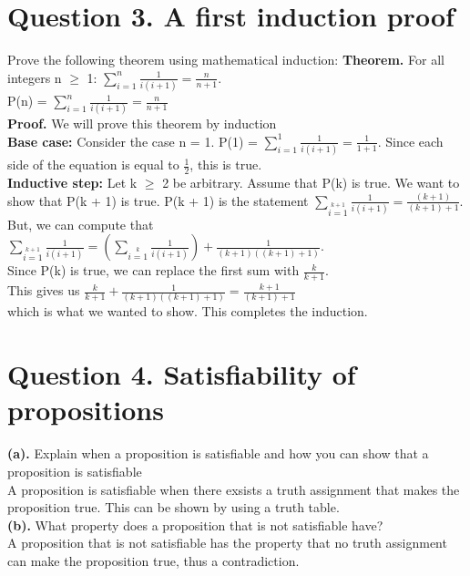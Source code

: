 \documentclass[a4paper]{article}
\begin{document}
\newpage

\section{Question 3. A first induction proof}
Prove the following theorem using mathematical induction:
\textbf{Theorem.} For all integers n $\geq $ 1: $\sum^n_{i=1}{\frac{1}{i(i + 1)} = \frac{n}{n + 1}}$.\\
P(n) = $\sum^n_{i=1}{\frac{1}{i(i + 1)} = \frac{n}{n + 1}}$\\
\textbf{Proof.} We will prove this theorem by induction\\
\textbf{Base case:} Consider the case n = 1. P(1) = $\sum^1_{i=1}{\frac{1}{i(i + 1)} = \frac{1}{1 + 1}}$. Since each side of the equation is equal to $\frac{1}{2}$, this is true.\\
\textbf{Inductive step:} Let k $\geq$ 2 be arbitrary. Assume that P(k) is true. We want to show that P(k + 1) is true. P(k + 1) is the statement $\sum_{i=1}\limits^{k+1}{\frac{1}{i(i + 1)} = \frac{(k+1)}{(k+1) + 1}}$. But, we can compute that\\
$\sum_{i=1}\limits^{k+1}{\frac{1}{i(i + 1)} = (\sum_{i=1}\limits^{k}{\frac{1}{i(i + 1)}}) + \frac{1}{(k+1)((k+1) + 1)}}$.\\
Since P(k) is true, we can replace the first sum with $\frac{k}{k + 1}$.\\
This gives us $\frac{k}{k + 1} + \frac{1}{(k+1)((k+1) + 1)} = \frac{k + 1}{(k + 1) + 1}$\\
which is what we wanted to show. This completes the induction.\\

\newpage

\section{Question 4. Satisfiability of propositions}
\textbf{(a).} Explain when a proposition is satisfiable and how you can show that a proposition is satisfiable\\
A proposition is satisfiable when there exsists a truth assignment that makes the proposition true. This can be shown by using a truth table.\\

\textbf{(b).} What property does a proposition that is not satisfiable have?\\
A proposition that is not satisfiable has the property that no truth assignment can make the proposition true, thus a contradiction.\\
\end{document}
